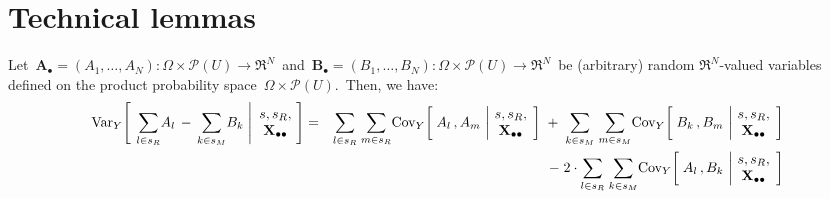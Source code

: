 

\section{Technical lemmas}


\begin{lemma}\label{sRsMPullOutOfVariance}
\mbox{}
\vskip 0.1cm
\noindent
Let
\,$\mathbf{A}_{\bullet} = (A_{1},\ldots,A_{N}) : \Omega\times\mathcal{P}(U) \longrightarrow \Re^{N}$\,
and
\,$\mathbf{B}_{\bullet} = (B_{1},\ldots,B_{N}) : \Omega\times\mathcal{P}(U) \longrightarrow \Re^{N}$\,
be (arbitrary) random $\Re^{N}$-valued variables defined on the product probability space
\,$\Omega\times\mathcal{P}(U)$.\,
Then, we have:
\begin{eqnarray*}
\Var_{Y}\!\left[\;
    \left.
    \underset{l \in s_{R}}{\sum}A_{l}
    \,-\,
    \underset{k \in s_{M}}{\sum}B_{k}
    \;\right\vert\!
    \begin{array}{c} s,s_{R}, \\ \Xobs \end{array}
    \!\right]
& = &
    \underset{l \in s_{R}}{\sum}\;
    \underset{m \in s_{R}}{\sum}
    \Cov_{Y}\!\left[\;
        A_{l} \,, A_{m}
        \,\left\vert\!
        \begin{array}{c} s,s_{R}, \\ \Xobs \end{array}
        \right.
        \!\right]
    \; + \;
    \underset{k \in s_{M}}{\sum}\;
    \underset{m \in s_{M}}{\sum}
    \Cov_{Y}\!\left[\;
        B_{k} \,, B_{m}
        \,\left\vert\!
        \begin{array}{c} s,s_{R}, \\ \Xobs \end{array}
        \right.
        \!\right]
\\
&&
    \; - \;
    2 \cdot
    \underset{l \in s_{R}}{\sum}\;
    \underset{k \in s_{M}}{\sum}
    \Cov_{Y}\!\left[\;
        A_{l} \,, B_{k}
        \,\left\vert\!
        \begin{array}{c} s,s_{R}, \\ \Xobs \end{array}
        \right.
        \!\right]
\end{eqnarray*}
\end{lemma}
\proof
